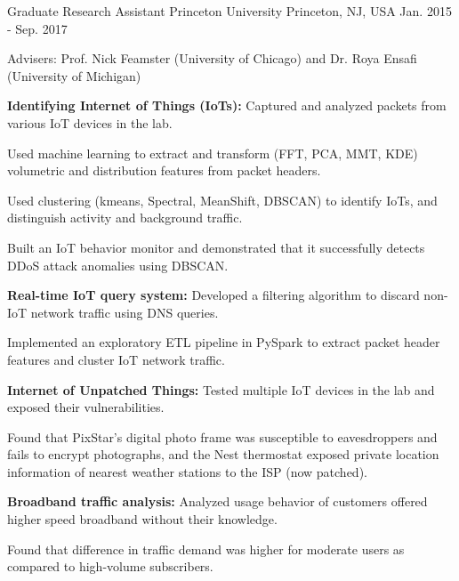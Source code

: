 \begin{cventries}
  \cventry
    {Graduate Research Assistant} %
    {Princeton University} %
    {Princeton, NJ, USA} %
    {Jan. 2015 - Sep. 2017} %
    {
      \begin{cvitems} %
      \item {Advisers: Prof. Nick Feamster (University of Chicago) and Dr. Roya Ensafi (University of Michigan)}
%      
      \item {\textbf{Identifying Internet of Things (IoTs):} Captured and analyzed packets from various IoT devices in the lab.
      		}
      \item {Used machine learning to extract and transform (FFT, PCA, MMT, KDE) volumetric and distribution features from packet headers.}
      \item {Used clustering (kmeans, Spectral, MeanShift, DBSCAN) to identify IoTs, and distinguish activity and background traffic.}
      \item {Built an IoT behavior monitor and demonstrated that it successfully detects DDoS attack anomalies using DBSCAN.
      		}
%      
      \item {\textbf{Real-time IoT query system:} Developed a filtering algorithm to discard non-IoT network traffic using DNS queries.
      		}
      \item {Implemented an exploratory ETL pipeline in PySpark to extract packet header features and cluster IoT network traffic.}
%      
      \item {\textbf{Internet of Unpatched Things:} Tested multiple IoT devices in the lab and exposed their vulnerabilities.
      		}
      \item {Found that PixStar's digital photo frame was susceptible to eavesdroppers and fails to encrypt photographs, and the Nest thermostat exposed private location information of nearest weather stations to the ISP (now patched).}
%      		
      \item {\textbf{Broadband traffic analysis:} Analyzed usage behavior of customers offered higher speed broadband without their knowledge.}
      \item {Found that difference in traffic demand was higher for moderate users as compared to high-volume subscribers.
}
\end{cvitems}}
\end{cventries}
